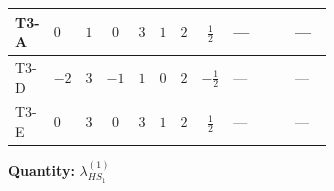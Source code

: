 \documentclass[8pt]{article}
\begin{document}
\begin{landscape}
\begin{longtable}{@{}llcccccc >{\raggedright\arraybackslash}p{0.21\linewidth} >{\raggedright\arraybackslash}p{0.21\linewidth} >{\raggedright\arraybackslash}p{0.21\linewidth}@{}}
\midrule
T3-A & $0$ & $1$ & $0$ & $3$ & $1$ & $2$ & $\frac{1}{2}$ & --- & \scriptsize\adjustbox{max width=\linewidth}{$\begin{gathered} +12 {\lambda_5} \left({\lambda_5}\right)^{*}\end{gathered}$} & --- \\
\midrule
T3-D & $-2$ & $3$ & $-1$ & $1$ & $0$ & $2$ & $-\frac{1}{2}$ & --- & \scriptsize\adjustbox{max width=\linewidth}{$\begin{gathered} +4 {\lambda_5} \left({\lambda_5}\right)^{*}\end{gathered}$} & --- \\
\midrule
T3-E & $0$ & $3$ & $0$ & $3$ & $1$ & $2$ & $\frac{1}{2}$ & --- & \scriptsize\adjustbox{max width=\linewidth}{$\begin{gathered} +4 {\lambda_5} \left({\lambda_5}\right)^{*}\end{gathered}$} & --- \\
\midrule
\bottomrule
\end{longtable}
\clearpage
\noindent\textbf{Quantity: }$\lambda_{HS_1}^{(1)}$\par\smallskip

\end{landscape}
\end{document}
